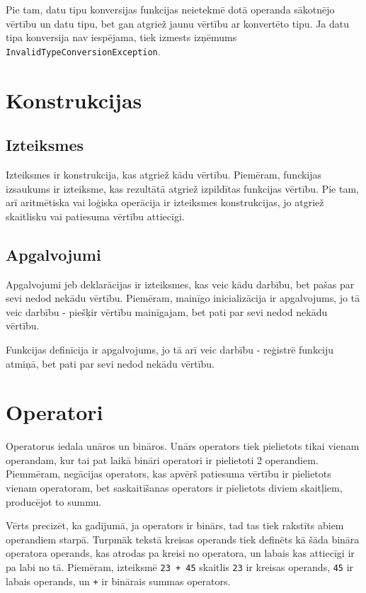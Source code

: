 \documentclass[12pt,a4paper]{report}
\begin{document}
Pie tam, datu tipu konversijas funkcijas neietekmē dotā operanda sākotnējo vērtību un datu tipu, bet gan atgriež jaunu vērtību ar konvertēto tipu. Ja datu tipa konversija nav iespējama, tiek izmests izņēmums \texttt{InvalidTypeConversionException}.

\section{Konstrukcijas}

\subsection{Izteiksmes}

Izteiksmes ir konstrukcija, kas atgriež kādu vērtību. Piemēram, funckijas izsaukums ir izteiksme, kas rezultātā atgriež izpildītas funkcijas vērtību. Pie tam, arī aritmētiska vai loģiska operācija ir izteiksmes konstrukcijas, jo atgriež skaitlisku vai patiesuma vērtību attiecīgi.

\subsection{Apgalvojumi}

Apgalvojumi jeb deklarācijas ir izteiksmes, kas veic kādu darbību, bet pašas par sevi nedod nekādu vērtību. Piemēram, mainīgo inicializācija ir apgalvojums, jo tā veic darbību - piešķir vērtību mainīgajam, bet pati par sevi nedod nekādu vērtību.

Funkcijas definīcija ir apgalvojums, jo tā arī veic darbību - reģistrē funkciju atmiņā, bet pati par sevi nedod nekādu vērtību.

\section{Operatori}
\label{section:operators}

Operatorus iedala unāros un bināros. Unārs operators tiek pielietots tikai vienam operandam, kur tai pat laikā bināri operatori ir pielietoti 2 operandiem. Piemmēram, negācijas operators, kas apvērš patiesuma vērtību ir pielietots vienam operatoram, bet saskaitīšanas operators ir pielietots diviem skaitļiem, producējot to summu.

Vērts precizēt, ka gadījumā, ja operators ir binārs, tad tas tiek rakstīts abiem operandiem starpā. Turpmāk tekstā kreisas operands tiek definēts kā šāda bināra operatora operands, kas atrodas pa kreisi no operatora, un labais kas attiecīgi ir pa labi no tā. Piemēram, izteiksmē \texttt{23 + 45} skaitlis \texttt{23} ir kreisas operands, \texttt{45} ir labais operands, un \texttt{+} ir binārais summas operators. \\
\end{document}
